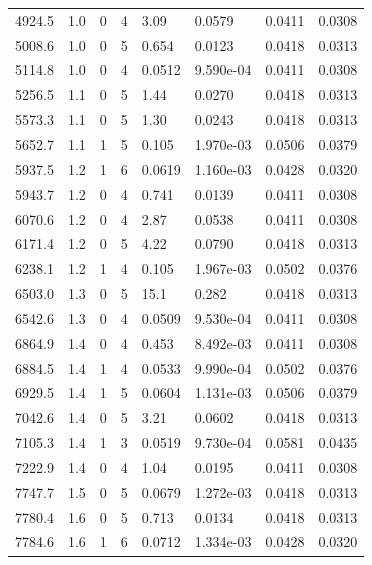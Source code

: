 \documentclass[preview]{standalone}
\begin{document}
{{{\begin{tabular}{L{1.2cm}C{1.2cm} C{0.3cm}C{0.5cm} C{1.4cm}C{1.4cm} C{1.4cm}C{1.4cm}}
  4924.5  &   1.0  & 0     &  4 &  3.09  & 0.0579  & 0.0411 &  0.0308   \\ 
  5008.6  &   1.0  & 0     &  5 &  0.654  & 0.0123  & 0.0418 &  0.0313   \\ 
  5114.8  &   1.0  & 0     &  4 &  0.0512  & 9.590e-04  & 0.0411 &  0.0308   \\ 
  5256.5  &   1.1  & 0     &  5 &  1.44  & 0.0270  & 0.0418 &  0.0313   \\ 
  5573.3  &   1.1  & 0     &  5 &  1.30  & 0.0243  & 0.0418 &  0.0313   \\ 
  5652.7  &   1.1  & 1     &  5 &  0.105  & 1.970e-03  & 0.0506 &  0.0379   \\ 
  5937.5  &   1.2  & 1     &  6 &  0.0619  & 1.160e-03  & 0.0428 &  0.0320   \\ 
  5943.7  &   1.2  & 0     &  4 &  0.741  & 0.0139  & 0.0411 &  0.0308   \\ 
  6070.6  &   1.2  & 0     &  4 &  2.87  & 0.0538  & 0.0411 &  0.0308   \\ 
  6171.4  &   1.2  & 0     &  5 &  4.22  & 0.0790  & 0.0418 &  0.0313   \\ 
  6238.1  &   1.2  & 1     &  4 &  0.105  & 1.967e-03  & 0.0502 &  0.0376   \\ 
  6503.0  &   1.3  & 0     &  5 &  15.1  & 0.282  & 0.0418 &  0.0313   \\ 
  6542.6  &   1.3  & 0     &  4 &  0.0509  & 9.530e-04  & 0.0411 &  0.0308   \\ 
  6864.9  &   1.4  & 0     &  4 &  0.453  & 8.492e-03  & 0.0411 &  0.0308   \\ 
  6884.5  &   1.4  & 1     &  4 &  0.0533  & 9.990e-04  & 0.0502 &  0.0376   \\ 
  6929.5  &   1.4  & 1     &  5 &  0.0604  & 1.131e-03  & 0.0506 &  0.0379   \\ 
  7042.6  &   1.4  & 0     &  5 &  3.21  & 0.0602  & 0.0418 &  0.0313   \\ 
  7105.3  &   1.4  & 1     &  3 &  0.0519  & 9.730e-04  & 0.0581 &  0.0435   \\ 
  7222.9  &   1.4  & 0     &  4 &  1.04  & 0.0195  & 0.0411 &  0.0308   \\ 
  7747.7  &   1.5  & 0     &  5 &  0.0679  & 1.272e-03  & 0.0418 &  0.0313   \\ 
  7780.4  &   1.6  & 0     &  5 &  0.713  & 0.0134  & 0.0418 &  0.0313   \\ 
  7784.6  &   1.6  & 1     &  6 &  0.0712  & 1.334e-03  & 0.0428 &  0.0320   \\ 

\end{tabular}}}}
\end{document}
